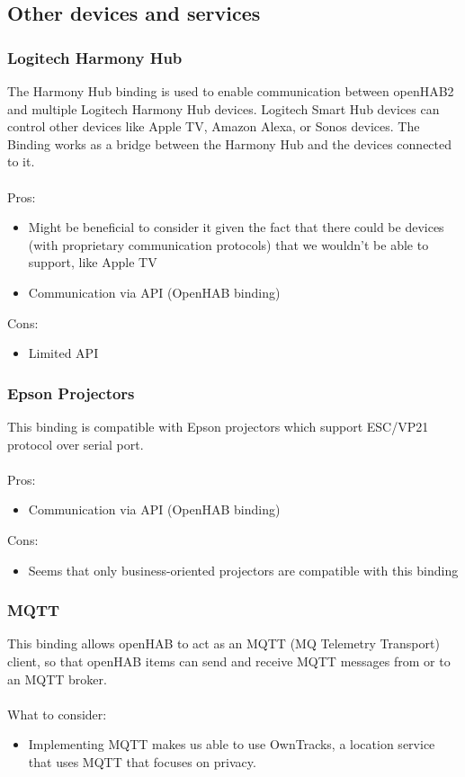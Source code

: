 \subsection{Other devices and services}

\subsubsection{Logitech Harmony  Hub}
The Harmony Hub binding is used to enable communication between openHAB2 and multiple Logitech Harmony Hub devices. Logitech Smart
Hub devices can control other devices like Apple TV, Amazon Alexa, or Sonos devices. The Binding works as a bridge between the Harmony 
Hub and the devices connected to it.\\~\\
Pros:
\begin{itemize}
	\item Might be beneficial to consider it given the fact that there could be devices (with proprietary communication protocols) that 
	we wouldn’t be able to support, like Apple TV
	\item Communication via API (OpenHAB binding)
\end{itemize}
Cons:
\begin{itemize}
	\item Limited API
\end{itemize}

\subsubsection{Epson Projectors}
This binding is compatible with Epson projectors which support ESC/VP21 protocol over serial port.\\~\\
Pros:
\begin{itemize}
	\item Communication via API (OpenHAB binding)
\end{itemize}
Cons:
\begin{itemize}
	\item Seems that only business-oriented projectors are compatible with this binding
\end{itemize}

\subsubsection{MQTT}
This binding allows openHAB to act as an MQTT (MQ Telemetry Transport) client, so that openHAB items can send and receive MQTT 
messages from or to an MQTT broker.\\~\\
What to consider:
\begin{itemize}
	\item Implementing MQTT makes us able to use OwnTracks, a location service that uses MQTT that focuses on privacy.
\end{itemize}

